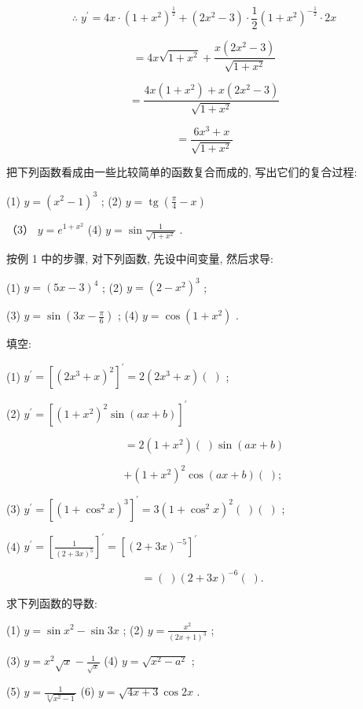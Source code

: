 \documentclass[lang=cn,newtx,12pt,scheme=chinese]{elegantbook}
\begin{document}
\[
\therefore \;{y}^{\prime } = {4x} \cdot {\left( 1 + {x}^{2}\right) }^{\frac{1}{2}} + \left( {2{x}^{2} - 3}\right) \cdot \frac{1}{2}{\left( 1 + {x}^{2}\right) }^{-\frac{1}{2}} \cdot {2x}
\]

\[
= {4x}\sqrt{1 + {x}^{2}} + \frac{x\left( {2{x}^{2} - 3}\right) }{\sqrt{1 + {x}^{2}}}
\]

\[
= \frac{{4x}\left( {1 + {x}^{2}}\right) + x\left( {2{x}^{2} - 3}\right) }{\sqrt{1 + {x}^{2}}}
\]

\[
= \frac{6{x}^{3} + x}{\sqrt{1 + {x}^{2}}}
\]

\begin{problemset}[练习]

\item 把下列函数看成由一些比较简单的函数复合而成的, 写出它们的复合过程:

(1) \(y = {\left( {x}^{2} - 1\right) }^{3}\) ; (2) \(y = \operatorname{tg}\left( {\frac{\pi }{4} - x}\right)\)

（3） \(y = {e}^{1 + {x}^{2}}\) (4) \(y = \sin \frac{1}{\sqrt{1 + {x}^{2}}}\) .

\item 按例 1 中的步骤, 对下列函数, 先设中间变量, 然后求导:

(1) \(y = {\left( 5x - 3\right) }^{4}\) ; (2) \(y = {\left( 2 - {x}^{2}\right) }^{3}\) ;

(3) \(y = \sin \left( {{3x} - \frac{\pi }{6}}\right)\) ; (4) \(y = \cos \left( {1 + {x}^{2}}\right)\) .

\item 填空:

(1) \({y}^{\prime } = {\left\lbrack {\left( 2{x}^{3} + x\right) }^{2}\right\rbrack }^{\prime } = 2\left( {2{x}^{3} + x}\right) \left( \;\right)\) ;

(2) \({y}^{\prime } = {\left\lbrack {\left( 1 + {x}^{2}\right) }^{2}\sin \left( ax + b\right) \right\rbrack }^{\prime }\)

\[
= 2\left( {1 + {x}^{2}}\right) \left( \;\right) \sin \left( {{ax} + b}\right)
\]

\[
+ {\left( 1 + {x}^{2}\right) }^{2}\cos \left( {{ax} + b}\right) \left( \;\right) \text{; }
\]

(3) \({y}^{\prime } = {\left\lbrack {\left( 1 + {\cos }^{2}x\right) }^{3}\right\rbrack }^{\prime } = 3{\left( 1 + {\cos }^{2}x\right) }^{2}\left( \;\right) \left( \;\right)\) ;

(4) \({y}^{\prime } = {\left\lbrack \frac{1}{{\left( 2 + 3x\right) }^{5}}\right\rbrack }^{\prime } = {\left\lbrack {\left( 2 + 3x\right) }^{-5}\right\rbrack }^{\prime }\)

\[
= \left( \;\right) {\left( 2 + 3x\right) }^{-6}\left( \;\right) \text{. }
\]

\item 求下列函数的导数:

(1) \(y = \sin {x}^{2} - \sin {3x}\) ; (2) \(y = \frac{{x}^{2}}{{\left( 2x + 1\right) }^{3}}\) ;

(3) \(y = {x}^{2}\sqrt{x} - \frac{1}{\sqrt{x}}\) (4) \(y = \sqrt{{x}^{2} - {a}^{2}}\) ;

(5) \(y = \frac{1}{\sqrt[3]{{x}^{2} - 1}}\) (6) \(y = \sqrt{{4x} + 3}\cos {2x}\) .
\end{problemset}
\end{document}
